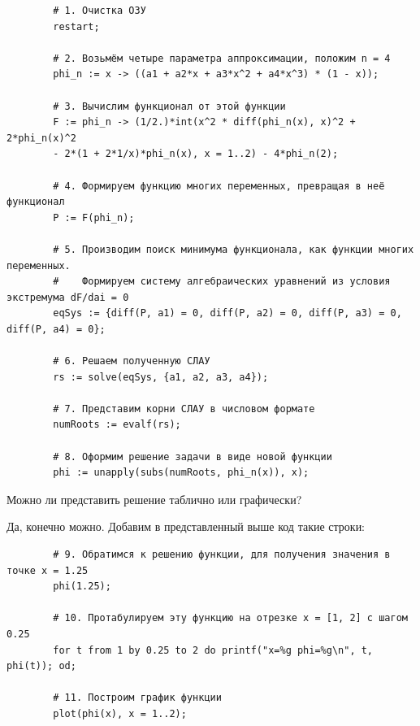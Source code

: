 \begin{commandline}
	\begin{verbatim}
		# 1. Очистка ОЗУ
		restart;		
		
		# 2. Возьмём четыре параметра аппроксимации, положим n = 4
		phi_n := x -> ((a1 + a2*x + a3*x^2 + a4*x^3) * (1 - x));	
		
		# 3. Вычислим функционал от этой функции
		F := phi_n -> (1/2.)*int(x^2 * diff(phi_n(x), x)^2 + 2*phi_n(x)^2
		- 2*(1 + 2*1/x)*phi_n(x), x = 1..2) - 4*phi_n(2);
		
		# 4. Формируем функцию многих переменных, превращая в неё функционал
		P := F(phi_n);	
		
		# 5. Производим поиск минимума функционала, как функции многих переменных.
		#    Формируем систему алгебраических уравнений из условия экстремума dF/dai = 0
		eqSys := {diff(P, a1) = 0, diff(P, a2) = 0, diff(P, a3) = 0, diff(P, a4) = 0};
		
		# 6. Решаем полученную СЛАУ
		rs := solve(eqSys, {a1, a2, a3, a4});
		
		# 7. Представим корни СЛАУ в числовом формате
		numRoots := evalf(rs);
		
		# 8. Оформим решение задачи в виде новой функции
		phi := unapply(subs(numRoots, phi_n(x)), x);
	\end{verbatim}
\end{commandline}

\newpage
\begin{question}
	Можно ли представить решение таблично или графически?
\end{question}

Да, конечно можно. Добавим в представленный выше код такие строки:

\begin{commandline}
	\begin{verbatim}
		# 9. Обратимся к решению функции, для получения значения в точке x = 1.25
		phi(1.25);
		
		# 10. Протабулируем эту функцию на отрезке x = [1, 2] с шагом 0.25
		for t from 1 by 0.25 to 2 do printf("x=%g phi=%g\n", t, phi(t)); od;
		
		# 11. Построим график функции
		plot(phi(x), x = 1..2);
	\end{verbatim}
\end{commandline}

